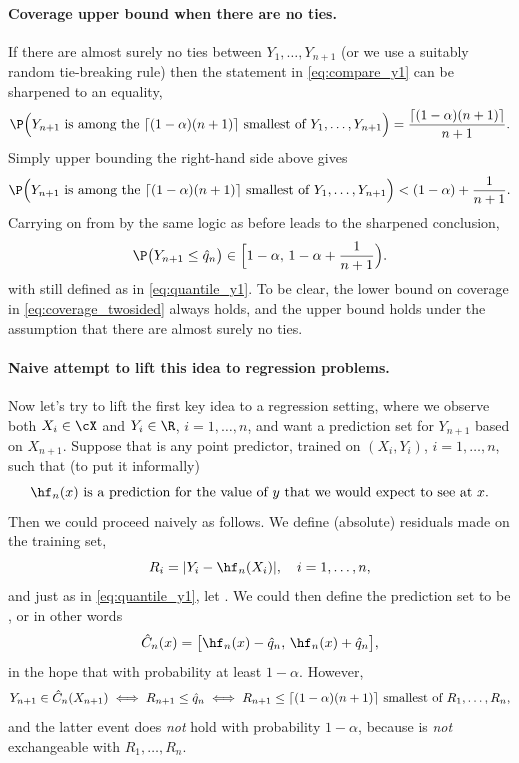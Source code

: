 \documentclass{article}
\begin{document}
\paragraph{Coverage upper bound when there are no ties.}

If there are almost surely no ties between $Y_1,\dots,Y_{n+1}$ (or we use a
suitably random tie-breaking rule) then the statement in \eqref{eq:compare_y1}
can be sharpened to an equality,  
\begin{equation}
\label{eq:compare_y3}
\P\Big( \text{$Y_{n+1}$ is among the $\lceil (1-\alpha)(n+1) \rceil$ smallest of 
  $Y_1,\dots,Y_{n+1}$} \Big) = \frac{\lceil (1-\alpha)(n+1) \rceil}{n+1}.
\end{equation}
Simply upper bounding the right-hand side above gives
\begin{equation}
\label{eq:compare_y4}
\P\Big( \text{$Y_{n+1}$ is among the $\lceil (1-\alpha)(n+1) \rceil$ smallest of 
  $Y_1,\dots,Y_{n+1}$} \Big) < (1-\alpha) + \frac{1}{n+1}.
\end{equation}
Carrying on from by the same logic as before leads to the sharpened conclusion, 
\begin{equation}
\label{eq:coverage_twosided}
\P\big( Y_{n+1} \leq \hq_n \big) \in \Big[ 1-\alpha, \, 1-\alpha + \frac{1}{n+1}
\Big).  
\end{equation}
with  still defined as in \eqref{eq:quantile_y1}. To be clear,
the lower bound on coverage in \eqref{eq:coverage_twosided} always holds, and
the upper bound holds under the assumption that there are almost surely no ties.  

\paragraph{Naive attempt to lift this idea to regression problems.} 

Now let's try to lift the first key idea to a regression setting, where we
observe both $X_i \in \cX$ and $Y_i \in \R$, $i=1,\dots,n$, and want a
prediction set for $Y_{n+1}$ based on $X_{n+1}$. Suppose that  is  
any point predictor, trained on $(X_i,Y_i)$, $i=1,\dots,n$, such that (to put it 
informally)  
\[
\text{$\hf_n(x)$ is a prediction for the value of $y$ that we would expect to
  see at $x$.}  
\]
Then we could proceed naively as follows. We define (absolute) residuals made on 
the training set,     
\[
R_i = |Y_i - \hf_n(X_i)|, \quad i=1,\dots,n,
\]
and just as in \eqref{eq:quantile_y1}, let . We could then define
the prediction set to be , or in other words
\[
\hC_n(x) = \big[ \hf_n(x) - \hq_n, \, \hf_n(x) + \hq_n \big], 
\]
in the hope that  with probability at least
$1-\alpha$. However, 
\[
Y_{n+1} \in \hat{C}_n(X_{n+1}) 
\iff R_{n+1} \leq \hat{q}_n 
\iff \text{$R_{n+1} \leq \lceil (1-\alpha)(n+1) \rceil$ smallest of
  $R_1,\dots,R_n$},   
\]
and the latter event does \emph{not} hold with probability $1-\alpha$, because
 is \emph{not} exchangeable with 
$R_1,\dots,R_n$. 
\end{document}
